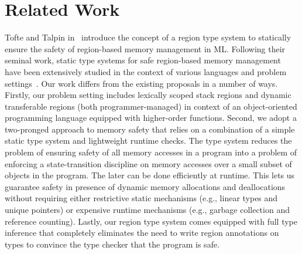 \section{Related Work}
\label{sec:related-work}


Tofte and Talpin in~\cite{tofte93,tofte94,tofte97} introduce the
concept of a region type system to statically ensure the safety of
region-based memory management in ML. Following their seminal work,
static type systems for safe region-based memory management have been
extensively studied in the context of various languages and problem
settings~\cite{cyclone02, cyclone04, yates99, MIT03, DPJ09, HMN01,
WW01, rust}. Our work differs from the existing proposals in a number
of ways. Firstly, our problem setting includes lexically scoped stack
regions and dynamic transferable regions (both programmer-managed) in
context of an object-oriented programming language equipped with
higher-order functions. Second, we adopt a two-pronged approach to
memory safety that relies on a combination of a simple static type
system and lightweight runtime checks. The type system reduces the
problem of ensuring safety of all memory accesses in a program into a
problem of enforcing a state-transition discipline on memory accesses
over a small subset of objects in the program. The later can be done
efficiently at runtime. This lets us guarantee safety in presence of
dynamic memory allocations and deallocations without requiring either
restrictive static mechanisms (e.g., linear types and unique pointers)
or expensive runtime mechanisms (e.g., garbage collection and
reference counting). Lastly, our region type system comes equipped
with full type inference that completely eliminates the need to write
region annotations on types to convince the type checker that the
program is safe. 

